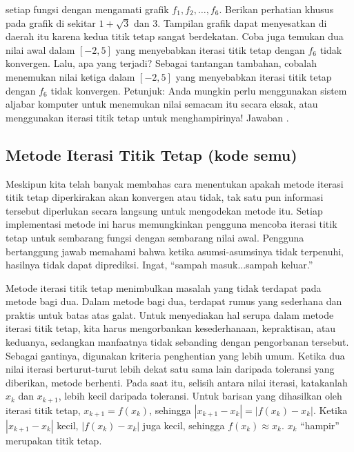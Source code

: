setiap fungsi dengan mengamati grafik $f_{1},f_{2},\ldots,f_{6}$.
Berikan perhatian khusus pada grafik di sekitar $1+\sqrt{3}$ dan
$3$. Tampilan grafik dapat menyesatkan di daerah itu karena kedua
titik tetap sangat berdekatan. Coba juga temukan dua nilai awal dalam
$[-2,5]$ yang menyebabkan iterasi titik tetap dengan $f_{6}$ tidak
konvergen. Lalu, apa yang terjadi? Sebagai tantangan tambahan, cobalah
menemukan nilai ketiga dalam $[-2,5]$ yang menyebabkan iterasi titik
tetap dengan $f_{6}$ tidak konvergen. Petunjuk: Anda mungkin perlu
menggunakan sistem aljabar komputer untuk menemukan nilai semacam
itu secara eksak, atau menggunakan iterasi titik tetap untuk menghampirinya!
Jawaban .

\subsection{Metode Iterasi Titik Tetap (kode semu)}

Meskipun kita telah banyak membahas cara menentukan apakah metode
iterasi titik tetap diperkirakan akan konvergen atau tidak, tak satu
pun informasi tersebut diperlukan secara langsung untuk mengodekan
metode itu. Setiap implementasi metode ini harus memungkinkan pengguna
mencoba iterasi titik tetap untuk sembarang fungsi dengan sembarang
nilai awal. Pengguna bertanggung jawab memahami bahwa ketika asumsi-asumsinya
tidak terpenuhi, hasilnya tidak dapat diprediksi. Ingat, ``sampah
masuk...sampah keluar.''

Metode iterasi titik tetap menimbulkan masalah yang tidak terdapat
pada metode bagi dua. Dalam metode bagi dua, terdapat rumus yang sederhana
dan praktis untuk batas atas galat. Untuk menyediakan hal serupa dalam
metode iterasi titik tetap, kita harus mengorbankan kesederhanaan,
kepraktisan, atau keduanya, sedangkan manfaatnya tidak sebanding dengan
pengorbanan tersebut. Sebagai gantinya, digunakan kriteria penghentian
yang lebih umum. Ketika dua nilai iterasi berturut-turut lebih dekat
satu sama lain daripada toleransi yang diberikan, metode berhenti.
Pada saat itu, selisih antara nilai iterasi, katakanlah $x_{k}$ dan
$x_{k+1}$, lebih kecil daripada toleransi. Untuk barisan yang dihasilkan
oleh iterasi titik tetap, $x_{k+1}=f(x_{k})$, sehingga $|x_{k+1}-x_{k}|=|f(x_{k})-x_{k}|$.
Ketika $|x_{k+1}-x_{k}|$ kecil, $|f(x_{k})-x_{k}|$ juga kecil, sehingga
$f(x_{k})\approx x_{k}$. $x_{k}$ ``hampir'' merupakan titik tetap.


